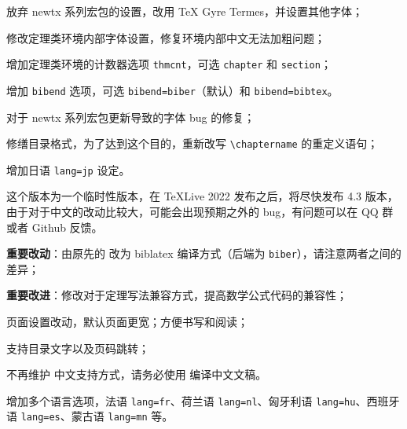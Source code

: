 \documentclass[lang=cn,newtx,10pt,scheme=chinese]{elegantbook}
\begin{document}

\begin{change}
  \item 放弃 newtx 系列宏包的设置，改用 TeX Gyre Termes，并设置其他字体；
  \item 修改定理类环境内部字体设置，修复环境内部中文无法加粗问题；
  \item 增加定理类环境的计数器选项 \lstinline{thmcnt}，可选 \lstinline{chapter} 和 \lstinline{section}；
  \item 增加 \lstinline{bibend} 选项，可选 \lstinline{bibend=biber}（默认）和 \lstinline{bibend=bibtex}。
\end{change}




\begin{change}
  \item 对于 newtx 系列宏包更新导致的字体 bug 的修复；
  \item 修缮目录格式，为了达到这个目的，重新改写 \lstinline{\chaptername} 的重定义语句；
  \item 增加日语 \lstinline{lang=jp} 设定。
  \item 这个版本为一个临时性版本，在 \TeX Live 2022 发布之后，将尽快发布 4.3 版本，由于对于中文的改动比较大，可能会出现预期之外的 bug，有问题可以在 QQ 群或者 Github 反馈。
\end{change}



\begin{change}
  \item \textbf{重要改动}：由原先的  改为 biblatex 编译方式（后端为 \lstinline{biber}），请注意两者之间的差异；
  \item \textbf{重要改进}：修改对于定理写法兼容方式，提高数学公式代码的兼容性；
  \item 页面设置改动，默认页面更宽；方便书写和阅读；
  \item 支持目录文字以及页码跳转；
  \item 不再维护  中文支持方式，请务必使用  编译中文文稿。
  \item 增加多个语言选项，法语 \lstinline{lang=fr}、荷兰语 \lstinline{lang=nl}、匈牙利语 \lstinline{lang=hu}、西班牙语 \lstinline{lang=es}、蒙古语 \lstinline{lang=mn} 等。
\end{change}


\end{document}
